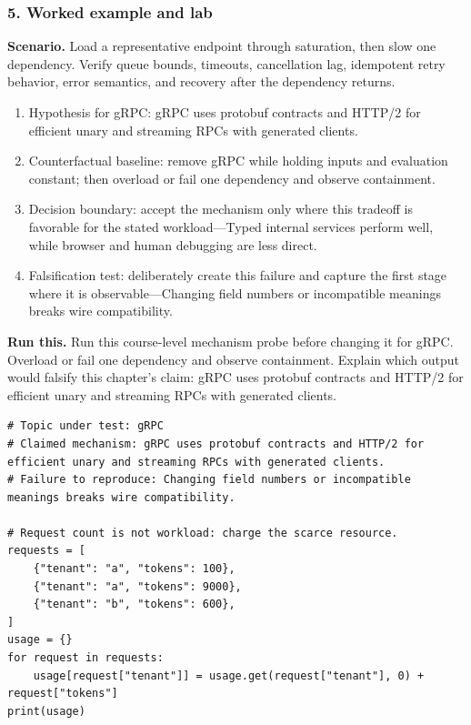 \subsubsection*{5. Worked example and lab}
\textbf{Scenario.} Load a representative endpoint through saturation, then slow one dependency. Verify queue bounds, timeouts, cancellation lag, idempotent retry behavior, error semantics, and recovery after the dependency returns.
\begin{enumerate}
\item Hypothesis for gRPC: gRPC uses protobuf contracts and HTTP/2 for efficient unary and streaming RPCs with generated clients.
\item Counterfactual baseline: remove gRPC while holding inputs and evaluation constant; then overload or fail one dependency and observe containment.
\item Decision boundary: accept the mechanism only where this tradeoff is favorable for the stated workload—Typed internal services perform well, while browser and human debugging are less direct.
\item Falsification test: deliberately create this failure and capture the first stage where it is observable—Changing field numbers or incompatible meanings breaks wire compatibility.
\end{enumerate}
\textbf{Run this.} Run this course-level mechanism probe before changing it for gRPC. Overload or fail one dependency and observe containment. Explain which output would falsify this chapter's claim: gRPC uses protobuf contracts and HTTP/2 for efficient unary and streaming RPCs with generated clients.
\begin{Verbatim}[fontsize=\scriptsize]
# Topic under test: gRPC
# Claimed mechanism: gRPC uses protobuf contracts and HTTP/2 for efficient unary and streaming RPCs with generated clients.
# Failure to reproduce: Changing field numbers or incompatible meanings breaks wire compatibility.

# Request count is not workload: charge the scarce resource.
requests = [
    {"tenant": "a", "tokens": 100},
    {"tenant": "a", "tokens": 9000},
    {"tenant": "b", "tokens": 600},
]
usage = {}
for request in requests:
    usage[request["tenant"]] = usage.get(request["tenant"], 0) + request["tokens"]
print(usage)
\end{Verbatim}
